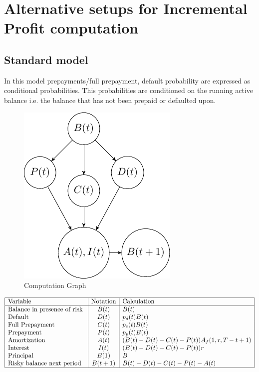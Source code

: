 \section{Alternative setups for Incremental Profit computation}



\subsection{Standard model \label{can}} 
In this model prepayments/full prepayment, default probability are expressed as conditional probabilities. This probabilities are conditioned on the running active balance i.e. the balance that has not been prepaid or defaulted upon.
\begin{figure}[H]
  \centering
      \includegraphics[width=.3\textwidth]{Graph2.pdf} 
 \caption{Computation Graph}
 \label{fig:graph2}
\end{figure}

\begin{center} %
\begin{math}
\begin{array}{|l|c|l|} \hline %
\mbox{Variable} &\mbox{Notation} & \mbox{Calculation}\\ \hline
\mbox{Balance in presence of risk }  & B(t)  & B(t)\\
\mbox{Default  }  & D(t) & p_d(t) B(t)\\
\mbox{Full Prepayment}  & C(t) & p_c(t) B(t)\\
\mbox{Prepayment  }  & P(t) & p_p(t)B(t)\\
\mbox{Amortization}  & A(t) &(B(t)-D(t)-C(t)-P(t)) A_f(1,r,T-t+1)\\
\mbox{Interest }  & I(t) & (B(t)-D(t)-C(t)-P(t))r\\
\mbox{Principal   }  &  B(1) & B\\
\mbox{Risky balance next period   }  &  B(t+1) & B(t)-D(t)-C(t)-P(t)-A(t)\\
\hline
\end{array} %
\end{math}
 \label{table:1}
\end{center}

